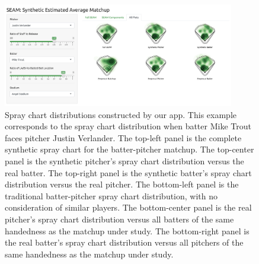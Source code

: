\documentclass[12pt]{article}
\begin{document}
\begin{figure}
\centering
    \includegraphics[width=0.90\textwidth]{ncombined.png}
    \caption{Spray chart distributions constructed by our app.  This example
    corresponds to the spray chart distribution when batter Mike Trout faces
    pitcher Justin Verlander.
    The top-left panel is the complete synthetic spray chart for
      the batter-pitcher matchup.
    The top-center panel is the synthetic pitcher's spray chart distribution
      versus the real batter.
    The top-right panel is the synthetic batter's spray chart distribution
      versus the real pitcher. 
    The bottom-left panel is the traditional batter-pitcher spray chart
      distribution, with no consideration of similar players.   
    The bottom-center panel is the real pitcher's spray chart distribution versus all batters of the same handedness as the matchup under study.
    The bottom-right panel is the real batter's spray chart distribution versus all pitchers of the same handedness as the matchup under study.
}
    \label{spraydists}
\end{figure}



\end{document}
